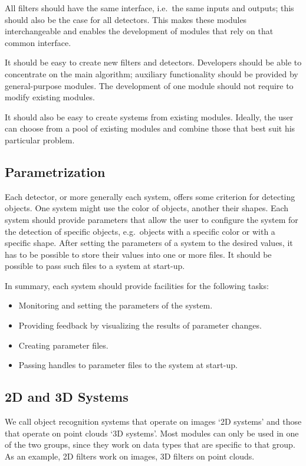 \documentclass{article}
\begin{document}
All filters should have the same interface, i.e.\ the same inputs and outputs;
this should also be the case for all detectors.
This makes these modules interchangeable
and enables the development of modules that rely on that common
interface.

It should be easy to create new filters and detectors. Developers should
be able to concentrate on the main algorithm; auxiliary functionality
should be provided by general-purpose modules.
The development of one module should not require to modify existing modules.

It should also be easy to create systems from existing modules.
Ideally, the user can choose from a pool of existing modules and combine
those that best suit his particular problem.


\subsection{Parametrization}
\label{sec:parametrization}

Each detector, or more generally each system, offers some criterion
for detecting objects.
One system might use the color of objects, another their shapes.
Each system should provide parameters that allow the user to
configure the system for the detection of specific objects, e.g.\ objects
with a specific color or with a specific shape.
After setting the parameters of a system to the desired values,
it has to be possible to store their values into one
or more files. 
It should be possible to pass such files to a system at start-up.

In summary, each system should provide facilities for the following tasks:
\begin{itemize}
	\item Monitoring and setting the parameters of the system.
	\item Providing feedback by visualizing the results of parameter changes.
	\item Creating parameter files.
	\item Passing handles to parameter files to the system at start-up.
\end{itemize}


\subsection{2D and 3D Systems}

We call object recognition systems that operate on images
`2D systems' and those that operate on point clouds `3D systems'.
Most modules can only be used in one of the two groups, since
they work on data types that are specific to that group.
As an example, 2D filters work on images, 3D filters on point clouds.
\end{document}

